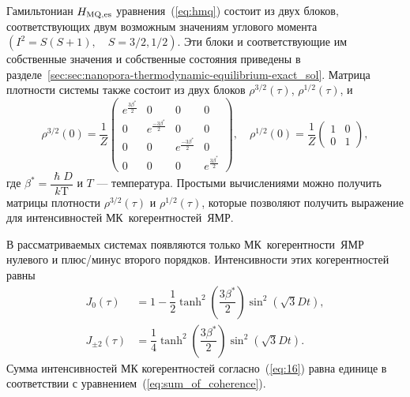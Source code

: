 Гамильтониан $H_\mathrm{MQ,es}$ уравнения~(\ref{eq:hmq}) состоит из двух блоков, соответствующих  двум возможным значениям углового момента $(I^2 = S(S+1), \quad S=3/2,1/2)$.
Эти блоки и соответствующие им собственные значения и собственные состояния приведены
в разделе~\ref{sec:sec:nanopora-thermodynamic-equilibrium-exact_sol}.
Матрица плотности системы также состоит из двух блоков $\rho^{3/2}(\tau)$, $\rho^{1/2}(\tau)$, и
%
\begin{equation}
  \label{eq:15}
  \rho^{3/2}(0) = \dfrac 1 Z
  \begin{pmatrix}
    e^{\frac{3\beta^*}{2}} & 0 & 0 & 0
    \\
    0 & e^{\frac{-3\beta^*}{2}} & 0 & 0
    \\
    0 & 0 & e^{\frac{-3\beta^*}{2}} & 0
    \\
    0 & 0 & 0 & e^{\frac{3\beta^*}{2}}
  \end{pmatrix},
  \quad
  \rho^{1/2}(0) = \dfrac 1 Z
  \begin{pmatrix}
    1 & 0 \\
    0 & 1
  \end{pmatrix},
\end{equation}
%
где $\beta^* = \dfrac{\hslash D}{k\mathrm{T}}$ и $T$ --- температура.
Простыми вычислениями можно получить матрицы плотности $\rho^{3/2}(\tau)$ и $\rho^{1/2}(\tau)$,
которые позволяют получить выражение для интенсивностей МК~когерентностей~ЯМР.

В рассматриваемых системах появляются только МК~когерентности~ЯМР нулевого и плюс/минус второго порядков.
Интенсивности этих когерентностей равны
%
\begin{equation}
  \begin{split}
    \label{eq:16}
    J_0(\tau) & = 1
    - \dfrac 1 2 \tanh^2\left( \dfrac{3\beta^*}{2} \right)
      \sin^2 \left( \sqrt{3} Dt \right),
    \\
    J_{\pm2}(\tau) & = \dfrac{1}{4}
      \tanh^2 \left( \dfrac{3\beta^*}{2} \right)
      \sin^2 \left( \sqrt{3} Dt \right).
  \end{split}
\end{equation}
%
Сумма интенсивностей МК когерентностей согласно~(\ref{eq:16}) равна единице в соответствии с уравнением~(\ref{eq:sum_of_coherence}).

